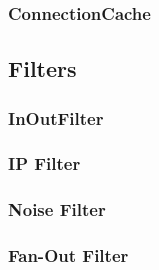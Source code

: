 \subsubsection{ConnectionCache}

\subsection{Filters}
\subsubsection{InOutFilter}
\subsubsection{IP Filter} 
\subsubsection{Noise Filter} 
\subsubsection{Fan-Out Filter}

